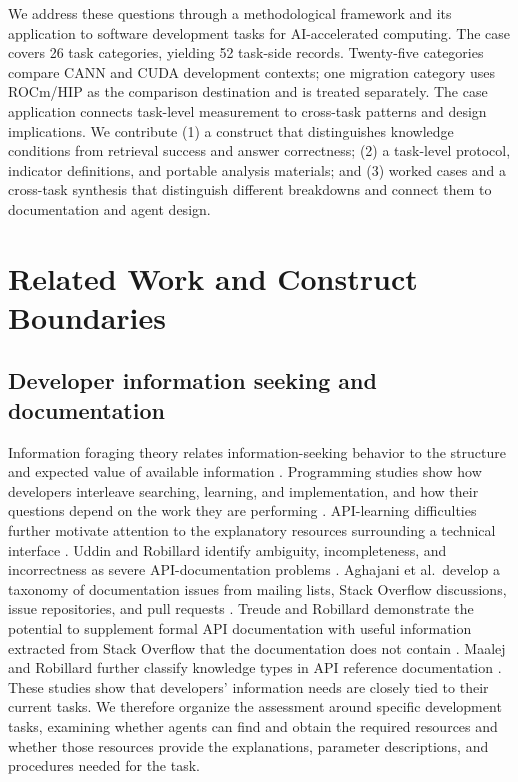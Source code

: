 \documentclass[manuscript,review,anonymous]{acmart}
\begin{document}
We address these questions through a methodological framework and its application to software development tasks for AI-accelerated computing. The case covers 26 task categories, yielding 52 task-side records. Twenty-five categories compare CANN and CUDA development contexts; one migration category uses ROCm/HIP as the comparison destination and is treated separately. The case application connects task-level measurement to cross-task patterns and design implications. We contribute (1) a construct that distinguishes knowledge conditions from retrieval success and answer correctness; (2) a task-level protocol, indicator definitions, and portable analysis materials; and (3) worked cases and a cross-task synthesis that distinguish different breakdowns and connect them to documentation and agent design.

\section{Related Work and Construct Boundaries}\label{related-work-and-construct-boundaries}

\subsection{Developer information seeking and documentation}\label{developer-information-seeking-and-documentation}

Information foraging theory relates information-seeking behavior to the structure and expected value of available information \citep{pirolli1999}. Programming studies show how developers interleave searching, learning, and implementation, and how their questions depend on the work they are performing \citep{brand2009, ko2007, sillito2008}. API-learning difficulties further motivate attention to the explanatory resources surrounding a technical interface \citep{robillard2009}. Uddin and Robillard identify ambiguity, incompleteness, and incorrectness as severe API-documentation problems \citep{uddin2015}. Aghajani et al.~develop a taxonomy of documentation issues from mailing lists, Stack Overflow discussions, issue repositories, and pull requests \citep{aghajani2019}. Treude and Robillard demonstrate the potential to supplement formal API documentation with useful information extracted from Stack Overflow that the documentation does not contain \citep{treude2016}. Maalej and Robillard further classify knowledge types in API reference documentation \citep{maalej2013}. These studies show that developers' information needs are closely tied to their current tasks. We therefore organize the assessment around specific development tasks, examining whether agents can find and obtain the required resources and whether those resources provide the explanations, parameter descriptions, and procedures needed for the task.
\end{document}
